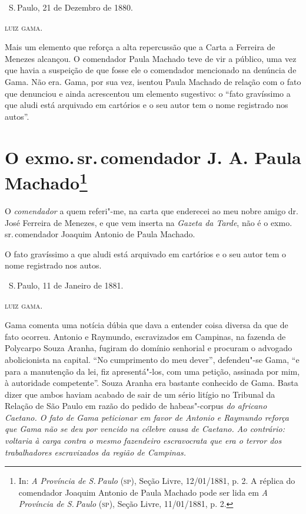 \dotfill{}

\hfill\ S.\,Paulo, 21 de Dezembro de 1880.\smallskip

\hfill\textsc{luiz gama.}

\pagebreak
\mbox{}\vfill
\thispagestyle{empty}

{\small\noindent
Mais um elemento que reforça a alta repercussão que a Carta a
Ferreira de Menezes alcançou. O comendador Paula Machado teve de vir a
público, uma vez que havia a suspeição de que fosse ele o comendador
mencionado na denúncia de Gama. Não era. Gama, por sua vez, isentou
Paula Machado de relação com o fato que denunciou e ainda acrescentou um
elemento sugestivo: o ``fato gravíssimo a que aludi está arquivado em
cartórios e o seu autor tem o nome registrado nos autos''. }

\chapter{O exmo.\,sr.\,comendador J. A. Paula Machado\footnote[*]{In:
  \emph{A Província de S.\,Paulo} (\textsc{sp}), Seção Livre, 12/01/1881, p. 2. A
  réplica do comendador Joaquim Antonio de Paula Machado pode ser lida
  em \emph{A Província de S.\,Paulo} (\textsc{sp}), Seção Livre, 11/01/1881, p. 2.}}


O \emph{comendador} a quem referi"-me, na carta que enderecei ao meu
nobre amigo dr.\,José Ferreira de Menezes, e que vem inserta na
\emph{Gazeta da Tarde}, não é o exmo.\,sr.\,comendador Joaquim Antonio de
Paula Machado.

O fato gravíssimo a que aludi está arquivado em cartórios e o seu autor
tem o nome registrado nos autos.

\bigskip

\hfill\ S.\,Paulo, 11 de Janeiro de 1881.

\hfill\textsc{luiz gama.}

\pagebreak
\mbox{}\vfill
\thispagestyle{empty}

{\small\noindent
Gama comenta uma notícia dúbia que dava a entender coisa diversa
da que de fato ocorreu. Antonio e Raymundo, escravizados em Campinas, na
fazenda de Polycarpo Souza Aranha, fugiram do domínio senhorial e
procuram o advogado abolicionista na capital. ``No cumprimento do meu
dever'', defendeu"-se Gama, ``e para a manutenção da lei, fiz
apresentá"-los, com uma petição, assinada por mim, à autoridade
competente''. Souza Aranha era bastante conhecido de Gama. Basta dizer
que ambos haviam acabado de sair de um sério litígio no Tribunal da
Relação de São Paulo em razão do pedido de} habeas"-corpus \emph{do
africano Caetano. O fato de Gama peticionar em favor de Antonio e
Raymundo reforça que Gama não se deu por vencido na célebre causa de
Caetano. Ao contrário: voltaria à carga contra o mesmo fazendeiro
escravocrata que era o terror dos trabalhadores escravizados da região
de Campinas. }

